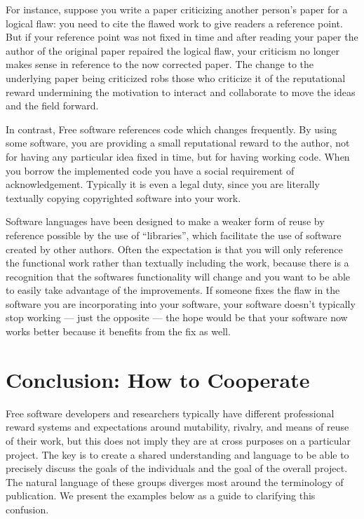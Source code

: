 \documentclass[
	fontsize=10pt, %
	twoside=false, %
	secnumdepth=1, %
]{kaobook}
\begin{document}
For instance, suppose you write a paper criticizing another person’s
paper for a logical flaw: you need to cite the flawed work to give
readers a reference point. But if your reference point was not fixed
in time and after reading your paper the author of the original paper
repaired the logical flaw, your criticism no longer makes sense in
reference to the now corrected paper. The change to the underlying
paper being criticized robs those who criticize it of the reputational
reward undermining the motivation to interact and collaborate to move
the ideas and the field forward.

In contrast, Free software references code which changes
frequently. By using some software, you are providing a small
reputational reward to the author, not for having any particular idea
fixed in time, but for having working code. When you borrow the
implemented code you have a social requirement of
acknowledgement. Typically it is even a legal duty, since you are
literally textually copying copyrighted software into your work.

Software languages have been designed to make a weaker form of reuse
by reference possible by the use of “libraries”, which facilitate the
use of software created by other authors. Often the expectation is
that you will only reference the functional work rather than textually
including the work, because there is a recognition that the softwares
functionality will change and you want to be able to easily take
advantage of the improvements. If someone fixes the flaw in the
software you are incorporating into your software, your software
doesn’t typically stop working — just the opposite — the hope would be
that your software now works better because it benefits from the fix
as well.

\section{Conclusion: How to Cooperate}
Free software developers and researchers typically have different professional reward systems and expectations around mutability, rivalry, and means of reuse of their work, but this does not imply they are at cross purposes on a particular project. The key is to create a shared understanding and language to be able to precisely discuss the goals of the individuals and the goal of the overall project. The natural language of these groups diverges most around the terminology of publication. We present the examples below as a guide to clarifying this confusion.
\end{document}
